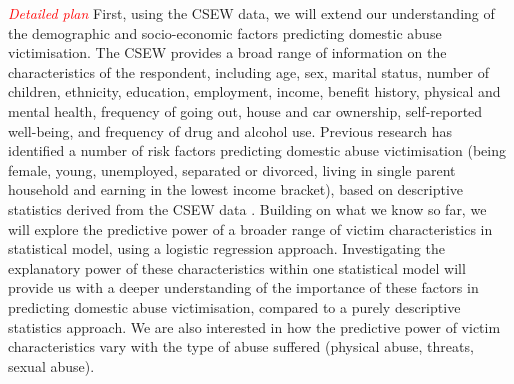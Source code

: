 \documentclass[11pt, a4paper]{article}
\begin{document}
%
%

\textcolor{red}{\textit{Detailed plan}} First, using the CSEW data, we will extend our understanding of the demographic and socio-economic factors predicting domestic abuse victimisation. The CSEW provides a broad range of information on the characteristics of the respondent, including age, sex, marital status, number of children, ethnicity, education, employment, income, benefit history, physical and mental health, frequency of going out, house and car ownership, self-reported well-being, and frequency of drug and alcohol use. Previous research has identified a number of risk factors predicting domestic abuse victimisation (being female, young, unemployed, separated or divorced, living in single parent household and earning in the lowest income bracket), based on descriptive statistics derived from the CSEW data \cite{ONS}. Building on what we know so far, we will explore the predictive power of a broader range of victim characteristics in statistical model, using a logistic regression approach. Investigating the explanatory power of these characteristics within one statistical model will provide us with a deeper understanding of the importance of these factors in predicting domestic abuse victimisation, compared to a purely descriptive statistics approach. We are also interested in how the predictive power of victim characteristics vary with the type of abuse suffered (physical abuse, threats, sexual abuse).
\end{document}

